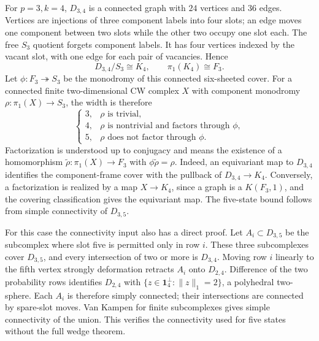 \documentclass[11pt]{article}
\theoremstyle{remark}\newtheorem{remark}[theorem]{Remark}
\newcommand{\one}{\mathbf 1}
\begin{document}
For $p=3,k=4$, $D_{3,4}$ is a connected graph with $24$ vertices and $36$ edges. Vertices are injections of three component labels into four slots; an edge moves one component between two slots while the other two occupy one slot each. The free $S_3$ quotient forgets component labels. It has four vertices indexed by the vacant slot, with one edge for each pair of vacancies. Hence
\[
 D_{3,4}/S_3\cong K_4,
 \qquad\pi_1(K_4)\cong F_3.
\]
Let $\phi:F_3\twoheadrightarrow S_3$ be the monodromy of this connected six-sheeted cover. For a connected finite two-dimensional CW complex $X$ with component monodromy $\rho:\pi_1(X)\to S_3$, the width is therefore
\[
 \begin{cases}
 3,&\rho\text{ is trivial},\\
 4,&\rho\text{ is nontrivial and factors through }\phi,\\
 5,&\rho\text{ does not factor through }\phi.
 \end{cases}
\]
Factorization is understood up to conjugacy and means the existence of a homomorphism $\widetilde\rho:\pi_1(X)\to F_3$ with $\phi\widetilde\rho=\rho$. Indeed, an equivariant map to $D_{3,4}$ identifies the component-frame cover with the pullback of $D_{3,4}\to K_4$. Conversely, a factorization is realized by a map $X\to K_4$, since a graph is a $K(F_3,1)$, and the covering classification gives the equivariant map. The five-state bound follows from simple connectivity of $D_{3,5}$.

For this case the connectivity input also has a direct proof. Let $A_i\subset D_{3,5}$ be the subcomplex where slot five is permitted only in row $i$. These three subcomplexes cover $D_{3,5}$, and every intersection of two or more is $D_{3,4}$. Moving row $i$ linearly to the fifth vertex strongly deformation retracts $A_i$ onto $D_{2,4}$. Difference of the two probability rows identifies $D_{2,4}$ with $\{z\in\one_4^\perp:\|z\|_1=2\}$, a polyhedral two-sphere. Each $A_i$ is therefore simply connected; their intersections are connected by spare-slot moves. Van Kampen for finite subcomplexes gives simple connectivity of the union. This verifies the connectivity used for five states without the full wedge theorem.
\end{document}
